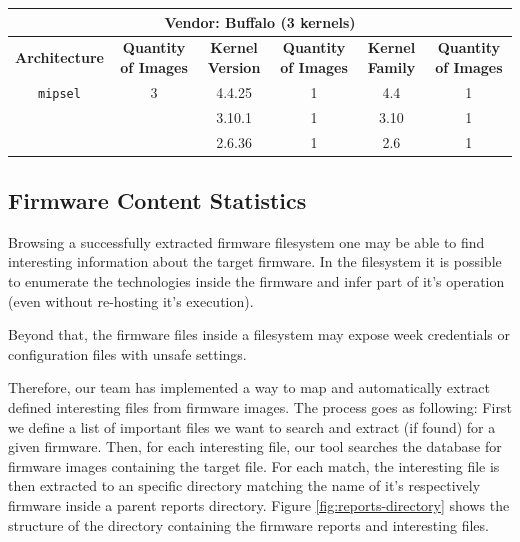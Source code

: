 \begin{table}[H]
{\begin{tabular}{|c|c|c|c|c|c|}
\multicolumn{6}{|c|}{\textbf{Vendor: Buffalo} (3 kernels)}                                                                    \\ \hline
\textbf{Architecture} & \multicolumn{1}{c|}{\textbf{Quantity of Images}} & \textbf{Kernel Version} & \multicolumn{1}{c|}{\textbf{Quantity of Images}} & \textbf{Kernel Family} & \textbf{Quantity of Images} \\ \hline
{\tt mipsel}            & \multicolumn{1}{c|}{3}                & 4.4.25                 & \multicolumn{1}{c|}{1}                            & 4.4                     & 1                          \\
                        & \multicolumn{1}{c|}{}                 & 3.10.1                  & \multicolumn{1}{c|}{1}                           & 3.10                    & 1                          \\
                        & \multicolumn{1}{c|}{}                 & 2.6.36                  & \multicolumn{1}{c|}{1}                           & 2.6                     & 1                          \\ \hline
\end{tabular}}
\label{tab:kernel-stats-by-vendor}
\end{table}

\subsection{Firmware Content Statistics}
\label{sec:firmware-content-statistics}

Browsing a successfully extracted firmware filesystem one may be able to find interesting information about the target firmware. In the filesystem it is possible to enumerate the technologies inside the firmware and infer part of it's operation (even without re-hosting it's execution).

Beyond that, the firmware files inside a filesystem may expose week credentials or configuration files with unsafe settings.

Therefore, our team has implemented a way to map and automatically extract defined interesting files from firmware images. The process goes as following: First we define a list of important files we want to search and extract (if found) for a given firmware. Then, for each interesting file, our tool searches the database for firmware images containing the target file. For each match, the interesting file is then extracted to an specific directory matching the name of it's respectively firmware inside a parent reports directory. Figure \ref{fig:reports-directory} shows the structure of the directory containing the firmware reports and interesting files.

